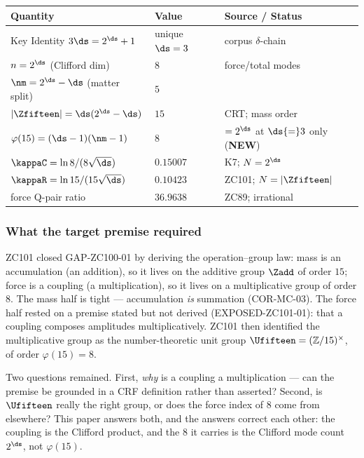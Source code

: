 \documentclass[12pt, a4paper]{article}
\begin{document}
\begin{keybox}[title={Numerical Summary --- ZC102 (T-canonical)}]
{\small\renewcommand{\arraystretch}{1.25}
\begin{center}
\begin{tabular}{@{}p{5.4cm}p{3.0cm}p{4.2cm}@{}}
\toprule
\textbf{Quantity} & \textbf{Value} & \textbf{Source / Status} \\
\midrule
Key Identity $3\ds=2^{\ds}+1$       & unique $\ds=3$ & corpus $\delta$-chain \\
$n=2^{\ds}$ (Clifford dim)          & $8$            & force/total modes \\
$\nm=2^{\ds}-\ds$ (matter split)    & $5$            & \\
$|\Zfifteen|=\ds(2^{\ds}-\ds)$      & $15$           & CRT; mass order \\
$\varphi(15)=(\ds-1)(\nm-1)$        & $8$            & $=2^{\ds}$ at $\ds{=}3$ only (\textbf{NEW}) \\
$\kappaC=\ln 8/(8\sqrt{\ds})$       & $0.15007$      & K7; $N=2^{\ds}$ \\
$\kappaR=\ln 15/(15\sqrt{\ds})$     & $0.10423$      & ZC101; $N=|\Zfifteen|$ \\
force Q-pair ratio                   & $36.9638$      & ZC89; irrational \\
\bottomrule
\end{tabular}
\end{center}}
\end{keybox}

\subsubsection{What the target premise required}

ZC101 closed GAP-ZC100-01 by deriving the operation--group law: mass is an
accumulation (an addition), so it lives on the additive group $\Zadd$ of order
$15$; force is a coupling (a multiplication), so it lives on a multiplicative
group of order $8$. The mass half is tight --- accumulation \emph{is} summation
(COR-MC-03). The force half rested on a premise stated but not derived
(EXPOSED-ZC101-01): that a coupling composes amplitudes multiplicatively. ZC101
then identified the multiplicative group as the number-theoretic unit group
$\Ufifteen=(\mathbb{Z}/15)^{\times}$, of order $\varphi(15)=8$.

Two questions remained. First, \emph{why} is a coupling a multiplication --- can
the premise be grounded in a CRF definition rather than asserted? Second, is
$\Ufifteen$ really the right group, or does the force index of $8$ come from
elsewhere? This paper answers both, and the answers correct each other: the
coupling is the Clifford product, and the $8$ it carries is the Clifford
mode count $2^{\ds}$, not $\varphi(15)$.
\end{document}

